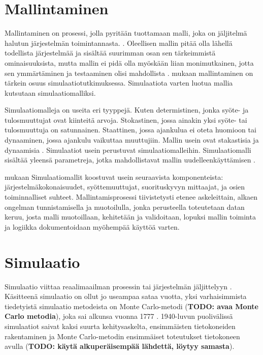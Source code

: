 \documentclass[utf8]{gradu3}
\begin{document}
\section{Mallintaminen} \label{mallintaminen}
Mallintaminen on prosessi, jolla pyritään tuottamaan malli, joka on jäljitelmä halutun järjestelmän toimintannasta. \parencite{maria1997introduction}. Oleellisen mallin pitää olla lähellä todellista järjestelmää ja sisältää suurimman osan sen tärkeimmistä ominaisuuksista, mutta mallin ei pidä olla myöskään liian monimutkainen, jotta sen ymmärtäminen ja testaaminen olisi mahdollista \parencite{maria1997introduction}. 
\textcite{maria1997introduction} mukaan mallintaminen on tärkein osuus simulaatiotutkimuksessa. Simulaatiota varten luotua mallia kutsutaan simulaatiomalliksi.

Simulaatiomalleja on useita eri tyyppejä. Kuten determistinen, jonka syöte- ja tulosmuuttujat ovat kiinteitä arvoja. Stokastinen, jossa ainakin yksi syöte- tai tulosmuuttuja on satunnainen. Staattinen, jossa ajankulua ei oteta huomioon tai dynaaminen, jossa ajankulu vaikuttaa muuttujiin. Mallin usein ovat stakastisia ja dynaamisia \parencite{maria1997introduction}. Simulaatiot usein perustuvat simulaatiomalleihin. Simulaatiomalli sisältää yleensä parametreja, jotka mahdollistavat
mallin uudelleenkäyttämisen \parencite{introduction2005simulation}. 

\textcite{maria1997introduction} mukaan Simulaatiomallit koostuvat usein seuraavista komponenteista: järjestelmäkokonaisuudet, syöttemuuttujat, suorituskyvyn mittaajat,
ja osien toiminnalliset suhteet. Mallintamisprosessi tiivistetysti etenee askeleittain, alkaen ongelman tunnistamisella ja muotoilulla, jonka perusteella toteutetaan datan keruu, josta malli muotoillaan, kehitetään ja validoitaan, lopuksi mallin toiminta ja logiikka dokumentoidaan myöhempää käyttöä varten.

\section{Simulaatio} \label{simulaatio}
Simulaatio viittaa reaalimaailman prosessin tai järjestelmän jäljittelyyn \parencite{banks1999introduction}. Käsitteenä simulaatio on ollut jo useampaa sataa vuotta, yksi varhaisimmista tiedetyistä simulaatio metodeista on Monte Carlo-metodi (\textbf{TODO: avaa Monte Carlo metodia}), joka sai alkunsa vuonna 1777 \parencite{HistoryOfSimulation}. 1940-luvun puolivälissä simulaatiot saivat kaksi suurta kehitysaskelta, ensimmäisten tietokoneiden rakentaminen ja Monte Carlo-metodin ensimmäiset toteutukset tietokoneen avulla \parencite{HistoryOfSimulation} (\textbf{TODO: käytä alkuperäisempää lähdettä, löytyy samasta}). 
\end{document}
